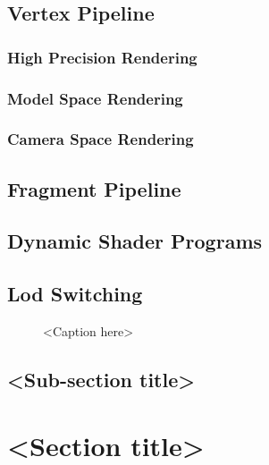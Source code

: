 \subsection{Vertex Pipeline}

\subsubsection{High Precision Rendering}

\subsubsection{Model Space Rendering}

\subsubsection{Camera Space Rendering}

\subsection{Fragment Pipeline}

\subsection{Dynamic Shader Programs}

\subsection{Lod Switching}



\begin{figure}[htb]
\centering
\caption{<Caption here>}
\end{figure}

\subsection{<Sub-section title>}

\section{<Section title>}

